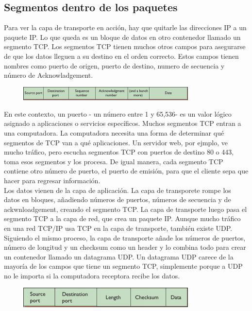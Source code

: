 \documentclass[12pt]{report}
\begin{document}
\subsection{Segmentos dentro de los paquetes}
Para ver la capa de transporte en acción, hay que quitarle las direcciones IP
a un paquete IP. Lo que queda es un bloque de datos en otro contenedor 
llamado un segmento TCP. Los segmentos TCP tienen muchos otros campos 
para asegurarse de que los datos lleguen a su destino en el orden correcto.
Estos campos tienen nombres como puerto de origen, puerto de destino, numero de secuencia 
y número de Acknowladgement.

\begin{figure}[h]
\centering
\includegraphics[width=0.8\textwidth]{Segmento.png}
\end{figure}

En este contexto, un puerto - un número entre 1 y 65,536- es un valor lógico
asignado a aplicaciones o servicios específicos. Muchos segmentos TCP entran a una computadora.
La computadora necesita una forma de determinar qué segmentos de TCP van a qué aplicaciones.
Un servidor web, por ejmplo, ve mucho tráfico, pero escucha segmentos TCP con puertos de destino
80 o 443, toma esos segmentos y los procesa. De igual manera, cada segmento TCP
contiene otro número de puerto, el puerto de emisión, para que el cliente sepa que hacer 
para regresar información.\\
Los datos vienen de la capa de aplicación. La capa de transporete rompe los datos 
en bloques, añadiendo números de puertos, números de secuencia y de ackwnloadgement, creando el
segmento TCP. La capa de transporte luego pasa el segmento TCP a la capa de red, que crea un paquete IP.
Aunque mucho tráfico en una red TCP/IP usa TCP en la capa de transporte, también existe UDP.
Siguiendo el mismo proceso, la capa de transporte añade los números de puertos, número de longitud y 
un checksum como un header y lo combina todo para crear un contenedor llamado un datagrama UDP.
Un datagrama UDP carece de la mayoría de los campos que tiene un segmento TCP, simplemente
porque a UDP no le importa si la computadora receptora recibe los datos.

\begin{figure}[h]
\centering
\includegraphics[width=0.8\textwidth]{Datagrama.png}
\end{figure}
\end{document}
